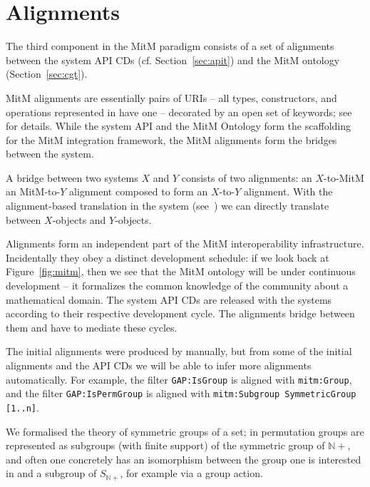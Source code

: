 \section{Alignments}\label{sec:alignments}
The third component in the MitM paradigm consists of a set of alignments between the
system API CDs (cf. Section~\ref{sec:apit}) and the MitM ontology (Section~\ref{sec:cgt}). 

MitM alignments are essentially pairs of \MMT URIs -- all types, constructors, and
operations represented in \OMMT have one -- decorated by an open set of keywords;
see~\cite{MueGauKal:cacfms17} for details. While the system API and the MitM Ontology form
the scaffolding for the MitM integration framework, the MitM alignments form the bridges
between the system.

A bridge between two systems $X$ and $Y$ consists of two alignments: an $X$-to-MitM an
MitM-to-$Y$ alignment composed to form an $X$-to-$Y$ alignment. With the alignment-based
translation in the \MMT system (see~\cite{MueRoYuRa:abtafs17}) we can directly translate
between $X$-objects and $Y$-objects. 

Alignments form an independent part of the MitM interoperability
infrastructure. Incidentally they obey a distinct development schedule: if we look back at
Figure~\ref{fig:mitm}, then we see that the MitM ontology will be under continuous
development -- it formalizes the common knowledge of the community about a mathematical
domain. The system API CDs are released with the systems according to their respective
development cycle. The alignments bridge between them and have to mediate these cycles.

The initial alignments were produced by manually, but from some of the initial alignments
and the \GAP API CDs we will be able to infer more alignments automatically.  For example,
the filter \texttt{GAP:IsGroup} is aligned with
\texttt{mitm:Group}, and the filter \texttt{GAP:IsPermGroup} is aligned with
\texttt{mitm:Subgroup SymmetricGroup [1..n]}.  

We formalised the theory of symmetric groups of a set; in \GAP permutation groups
are represented as subgroups (with finite support) of the symmetric group of
$\mathbb{N}+$, and often one concretely has an isomorphism between the group one
is interested in and a subgroup of $S_{\mathbb{N}+}$, for example
via a group action.

